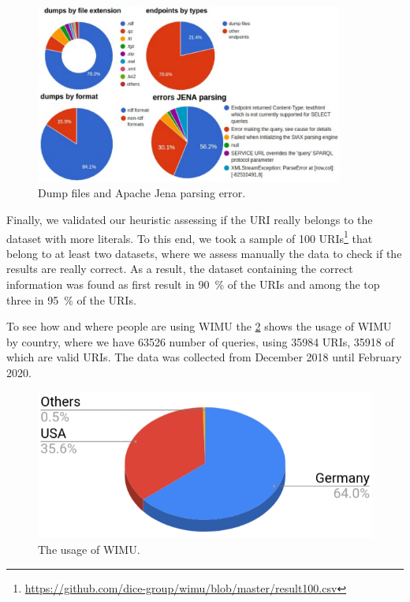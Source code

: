\documentclass[sw]{iosart2x}
\begin{document}
\begin{figure}[htp] 
	\centering
	\includegraphics[width=0.9\textwidth]{img/dumps3.pdf}
	\caption{Dump files and Apache Jena parsing error.}
	\label{fig:dumps}
\end{figure}

Finally, we validated our heuristic assessing if the URI really belongs to the dataset with more literals.
To this end, we took a sample of 100 URIs\footnote{\url{https://github.com/dice-group/wimu/blob/master/result100.csv}} that belong to at least two datasets, where we assess manually the data to check if the results are really correct. 
As a result, the dataset containing the correct information was found as first result in \SI{90}{\percent} of the URIs and among the top three in \SI{95}{\percent} of the URIs.

To see how and where people are using WIMU the \cref{fig:wimuUsage} shows the usage of WIMU by country, where we have \num{63526} number of queries, using \num{35984} URIs, \num{35918} of which are valid URIs. The data was collected from December 2018 until February 2020. 

\begin{figure}[htp] 
	\centering
	\includegraphics[width=\linewidth]{img/wimuUsage.png}
	\caption{The usage of WIMU.}
	\label{fig:wimuUsage}
\end{figure}
\end{document}
